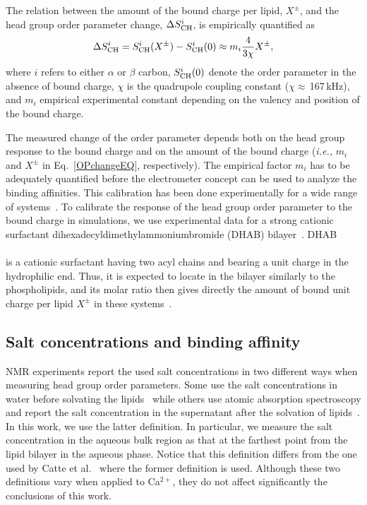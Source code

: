\documentclass[aip,jcp,twocolumn]{revtex4}
\begin{document}
The relation between the amount of the bound charge per lipid, $X^\pm$, and the head group order parameter change, $\Delta S_{\rm{CH}}^{i}$, is empirically quantified as~\cite{seelig87,ferreira16}
\begin{equation}\label{OPchangeEQ}
\Delta S_{\rm{CH}}^{i}= S_{\rm{CH}}^{i}(X^\pm)-S_{\rm{CH}}^{i}(0) \approx m_i \frac{4 }{3\chi}X^\pm,
\end{equation}
where $i$ refers to either $\alpha$ or $\beta$ carbon, $S_{\rm{CH}}^{i}(0)$ denote the order parameter in the absence of bound charge, $\chi$ is the quadrupole coupling constant ($\chi \approx$\,167\,kHz), and $m_i$ empirical experimental constant depending on the valency and position of the bound charge.


The measured change of the order parameter depends both on the head group response to the bound charge and on the amount of the bound charge (\textit{i.e.,} $m_i$ and $X^\pm$ in Eq.~\ref{OPchangeEQ}, respectively).  The empirical factor $m_i$ has to be adequately quantified before the electrometer concept can be used to analyze the binding affinities. This calibration has been done experimentally for a wide range of systems~\cite{seelig87, beschiasvili91}. To calibrate the response of the head group order parameter to the bound charge in simulations, we use experimental data for a strong cationic surfactant dihexadecyldimethylammoniumbromide  (DHAB) bilayer~\cite{scherer89}. DHAB\\[0.5cm]
\vspace{0.5cm} \\
is a cationic surfactant having two acyl chains and bearing a unit charge in the hydrophilic end. Thus, it is expected to locate in the bilayer similarly to the phospholipids, and its molar ratio then gives directly the amount of bound unit charge per lipid $X^\pm$ in these systems~\cite{scherer89}.

\subsection{Salt concentrations and binding affinity}
NMR experiments report the used salt concentrations in two different ways when measuring head group order parameters. Some use the salt concentrations in water before solvating the lipids~\cite{akutsu81} while others use atomic absorption spectroscopy and report the salt concentration in the supernatant after the solvation of lipids~\cite{altenbach84}. In this work, we use the latter definition. In particular, we measure the salt concentration in the aqueous bulk region as that at the farthest point from the lipid bilayer in the aqueous phase. Notice that this definition differs from the one used by Catte et al.~\cite{catte16} where the former definition is used. Although these two definitions vary when applied to Ca$^{2+}$, they do not affect significantly the conclusions of this work.
\end{document}
